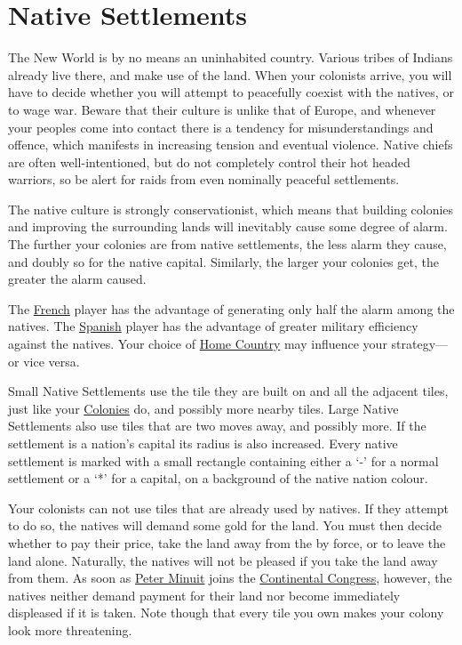 \documentclass[12pt]{book}
\begin{document}
\hypertarget{Native Settlements}{\section{Native Settlements}}

The New World is by no means an uninhabited country. Various tribes of
Indians already live there, and make use of the land. When your
colonists arrive, you will have to decide whether you will attempt to
peacefully coexist with the natives, or to wage war. Beware that
their culture is unlike that of Europe, and whenever your peoples come
into contact there is a tendency for misunderstandings and offence,
which manifests in increasing tension and eventual violence. Native
chiefs are often well-intentioned, but do not completely control their
hot headed warriors, so be alert for raids from even nominally
peaceful settlements.

The native culture is strongly conservationist, which means that
building colonies and improving the surrounding lands will inevitably
cause some degree of alarm. The further your colonies are from native
settlements, the less alarm they cause, and doubly so for the native
capital. Similarly, the larger your colonies get, the greater the
alarm caused.

The \hyperlink{France}{French} player has the advantage of generating only
half the alarm among the natives. The \hyperlink{Spain}{Spanish}
player has the advantage of greater military efficiency against the
natives. Your choice of \hyperlink{Home Country}{Home Country} may
influence your strategy--- or vice versa.

Small Native Settlements use the tile they are built on and all the
adjacent tiles, just like your \hyperlink{Colonies}{Colonies} do, and
possibly more nearby tiles. Large Native Settlements also use tiles
that are two moves away, and possibly more. If the settlement is a
nation's capital its radius is also increased. Every native settlement
is marked with a small rectangle containing either a `-' for a normal
settlement or a `*' for a capital, on a background of the native
nation colour.

Your colonists can not use tiles that are already used by natives. If
they attempt to do so, the natives will demand some gold for the
land. You must then decide whether to pay their price, take the land
away from the by force, or to leave the land alone. Naturally, the
natives will not be pleased if you take the land away from them. As
soon as \hyperlink{Peter Minuit}{Peter Minuit} joins the
\hyperlink{Continental Congress}{Continental Congress}, however, the
natives neither demand payment for their land nor become immediately
displeased if it is taken. Note though that every tile you own makes
your colony look more threatening.
\end{document}
